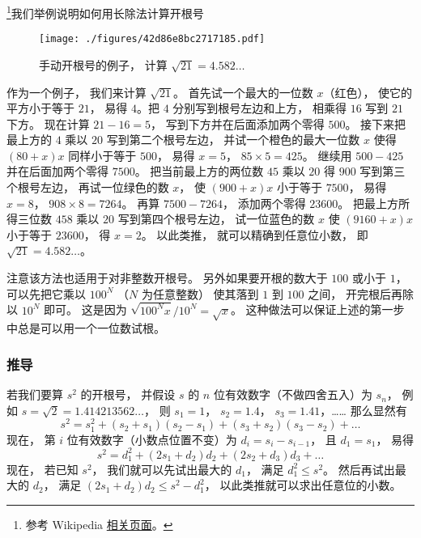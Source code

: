 
\footnote{参考 Wikipedia \href{https://en.wikipedia.org/wiki/Methods_of_computing_square_roots}{相关页面}。}我们举例说明如何用长除法计算开根号
\begin{example}{}
\begin{figure}[ht]
\centering
\texttt{[image: ./figures/42d86e8bc2717185.pdf]}
\caption{手动开根号的例子， 计算 $\sqrt{21} = 4.582\dots$} \label{fig_Hsqrt_1}
\end{figure}
作为一个例子， 我们来计算 $\sqrt{21}$。 首先试一个最大的一位数 $x$（红色）， 使它的平方小于等于 $21$， 易得 $4$。把 $4$ 分别写到根号左边和上方， 相乘得 $16$ 写到 $21$ 下方。 现在计算 $21-16 = 5$， 写到下方并在后面添加两个零得 $500$。 接下来把最上方的 $4$ 乘以 $20$ 写到第二个根号左边， 并试一个橙色的最大一位数 $x$ 使得 $(80+x) x$ 同样小于等于 $500$， 易得 $x = 5$， $85\times 5 = 425$。 继续用 $500-425$ 并在后面加两个零得 $7500$。 把当前最上方的两位数 $45$ 乘以 $20$ 得 $900$ 写到第三个根号左边， 再试一位绿色的数 $x$， 使 $(900+ x) x$ 小于等于 $7500$， 易得 $x = 8$， $908\times 8 = 7264$。 再算 $7500-7264$， 添加两个零得 $23600$。 把最上方所得三位数 $458$ 乘以 $20$ 写到第四个根号左边， 试一位蓝色的数 $x$ 使 $(9160+x)x$ 小于等于 $23600$， 得 $x = 2$。 以此类推， 就可以精确到任意位小数， 即 $\sqrt{21} = 4.582\dots$。

注意该方法也适用于对非整数开根号。 另外如果要开根的数大于 $100$ 或小于 $1$， 可以先把它乘以 $100^{N}$ （$N$ 为任意整数） 使其落到 $1$ 到 $100$ 之间， 开完根后再除以 $10^N$ 即可。 这是因为 $\sqrt{100^{N} x}/10^N =  \sqrt{x}$。 这种做法可以保证上述的第一步中总是可以用一个一位数试根。
\end{example}

\subsubsection{推导}
若我们要算 $s^2$ 的开根号， 并假设 $s$ 的 $n$ 位有效数字（不做四舍五入）为 $s_n$， 例如 $s = \sqrt{2} = 1.414213562\dots$， 则 $s_1 = 1$， $s_2=1.4$， $s_3=1.41$，…… 那么显然有
\begin{equation}
s^2 = s_1^2 + (s_2+s_1)(s_2-s_1) + (s_3+s_2)(s_3-s_2) + \dots
\end{equation}
现在， 第 $i$ 位有效数字（小数点位置不变）为 $d_i = s_i-s_{i-1}$， 且 $d_1 = s_1$， 易得
\begin{equation}
s^2 = d_1^2 + (2s_1 + d_2)d_2 + (2s_2 + d_3)d_3 + \dots
\end{equation}
现在， 若已知 $s^2$， 我们就可以先试出最大的 $d_1$， 满足 $d_1^2\leqslant s^2$。 然后再试出最大的 $d_2$， 满足 $(2s_1 + d_2)d_2 \leqslant s^2 - d_1^2$， 以此类推就可以求出任意位的小数。
